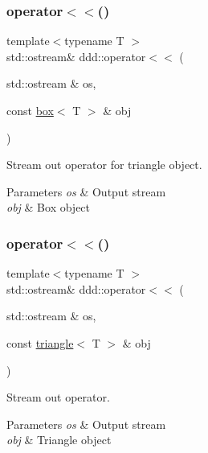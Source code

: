 \subsubsection{\texorpdfstring{operator$<$$<$()}{operator<<()}\hspace{0.1cm}{\footnotesize\ttfamily [7/10]}}
{\footnotesize\ttfamily template$<$typename T $>$ \\
std\+::ostream\& ddd\+::operator$<$$<$ (\begin{DoxyParamCaption}\item[{std\+::ostream \&}]{os,  }\item[{const \hyperlink{classddd_1_1box}{box}$<$ T $>$ \&}]{obj }\end{DoxyParamCaption})\hspace{0.3cm}{\ttfamily [inline]}}



Stream out operator for triangle object. 


\begin{DoxyParams}{Parameters}
{\em os} & Output stream \\
\hline
{\em obj} & Box object \\
\hline
\end{DoxyParams}
\mbox{\label{namespaceddd_a3a6f828f85e4fa306f0d950f1aab4f64}} 
\subsubsection{\texorpdfstring{operator$<$$<$()}{operator<<()}\hspace{0.1cm}{\footnotesize\ttfamily [8/10]}}
{\footnotesize\ttfamily template$<$typename T $>$ \\
std\+::ostream\& ddd\+::operator$<$$<$ (\begin{DoxyParamCaption}\item[{std\+::ostream \&}]{os,  }\item[{const \hyperlink{classddd_1_1triangle}{triangle}$<$ T $>$ \&}]{obj }\end{DoxyParamCaption})\hspace{0.3cm}{\ttfamily [inline]}}



Stream out operator. 


\begin{DoxyParams}{Parameters}
{\em os} & Output stream \\
\hline
{\em obj} & Triangle object \\
\hline
\end{DoxyParams}
\mbox{\label{namespaceddd_a58ae88cefdf3b919e400db6de59f4cfc}} 
